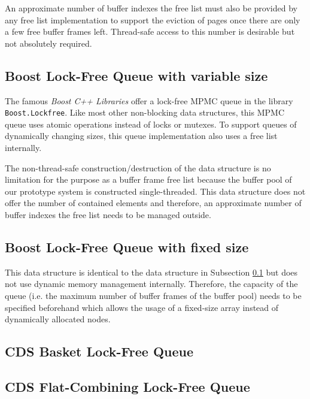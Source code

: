 	An approximate number of buffer indexes the free list must also be provided by any free list implementation to support the eviction of pages once there are only a few free buffer frames left. Thread-safe access to this number is desirable but not absolutely required.

\subsection[Boost Lock-Free Queue with variable size]{Boost Lock-Free Queue with variable size} \label{subsec:boost}

	The famous \textit{Boost C++ Libraries} offer a lock-free MPMC queue in the library \lstinline{Boost.Lockfree}. Like most other non-blocking data structures, this MPMC queue uses atomic operations instead of locks or mutexes. To support queues of dynamically changing sizes, this queue implementation also uses a free list internally.
	
	The non-thread-safe construction/destruction of the data structure is no limitation for the purpose as a buffer frame free list because the buffer pool of our prototype system is constructed single-threaded. This data structure does not offer the number of contained elements and therefore, an approximate number of buffer indexes the free list needs to be managed outside.

\subsection[Boost Lock-Free Queue with fixed size]{Boost Lock-Free Queue with fixed size} \label{subsec:boost-fixed}

	This data structure is identical to the data structure in Subsection \ref{subsec:boost} but does not use dynamic memory management internally. Therefore, the capacity of the queue (i.e. the maximum number of buffer frames of the buffer pool) needs to be specified beforehand which allows the usage of a fixed-size array instead of dynamically allocated nodes.

\subsection[CDS BasketQueue]{CDS Basket Lock-Free Queue} \label{subsec:cds-basket}

	\cite{Hoffman:2007}

\subsection[CDS FCQueue]{CDS Flat-Combining Lock-Free Queue} \label{subsec:cds-fc}

